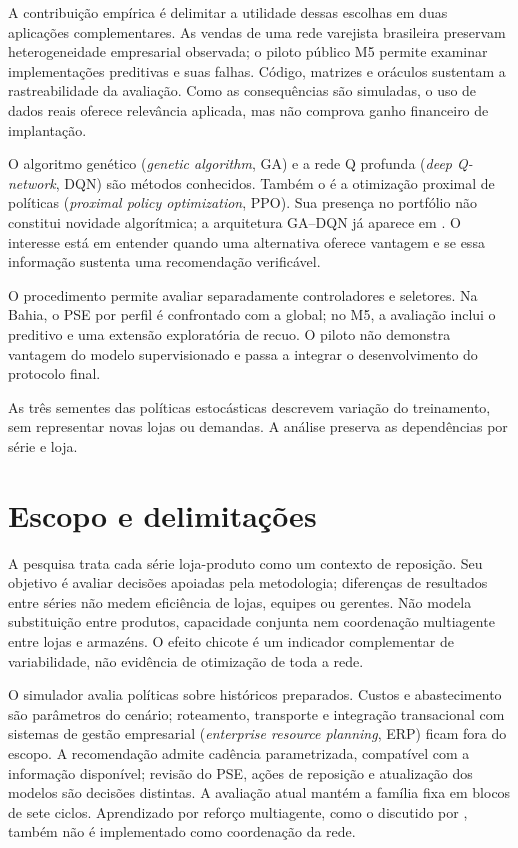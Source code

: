 A contribuição empírica é delimitar a utilidade dessas escolhas em duas aplicações complementares. As vendas de uma rede varejista brasileira preservam heterogeneidade empresarial observada; o piloto público M5 permite examinar implementações preditivas e suas falhas. Código, matrizes e oráculos sustentam a rastreabilidade da avaliação. Como as consequências são simuladas, o uso de dados reais oferece relevância aplicada, mas não comprova ganho financeiro de implantação.

O algoritmo genético (\textit{genetic algorithm}, GA) e a rede Q profunda (\textit{deep Q-network}, DQN) são métodos conhecidos. Também o é a otimização proximal de políticas (\textit{proximal policy optimization}, PPO). Sua presença no portfólio não constitui novidade algorítmica; a arquitetura GA--DQN já aparece em \citet{Zabraoui2025GaDQN}. O interesse está em entender quando uma alternativa oferece vantagem e se essa informação sustenta uma recomendação verificável.

O procedimento permite avaliar separadamente controladores e seletores. Na Bahia, o PSE por perfil é confrontado com a global; no M5, a avaliação inclui o preditivo e uma extensão exploratória de recuo. O piloto não demonstra vantagem do modelo supervisionado e passa a integrar o desenvolvimento do protocolo final.

As três sementes das políticas estocásticas descrevem variação do treinamento, sem representar novas lojas ou demandas. A análise preserva as dependências por série e loja.

\section{Escopo e delimitações}
\label{sec:delimitacoes}

A pesquisa trata cada série loja-produto como um contexto de reposição. Seu objetivo é avaliar decisões apoiadas pela metodologia; diferenças de resultados entre séries não medem eficiência de lojas, equipes ou gerentes. Não modela substituição entre produtos, capacidade conjunta nem coordenação multiagente entre lojas e armazéns. O efeito chicote é um indicador complementar de variabilidade, não evidência de otimização de toda a rede.

O simulador avalia políticas sobre históricos preparados. Custos e abastecimento são parâmetros do cenário; roteamento, transporte e integração transacional com sistemas de gestão empresarial (\textit{enterprise resource planning}, ERP) ficam fora do escopo. A recomendação admite cadência parametrizada, compatível com a informação disponível; revisão do PSE, ações de reposição e atualização dos modelos são decisões distintas. A avaliação atual mantém a família fixa em blocos de sete ciclos. Aprendizado por reforço multiagente, como o discutido por \citet{Liu2024HAPPO}, também não é implementado como coordenação da rede.


